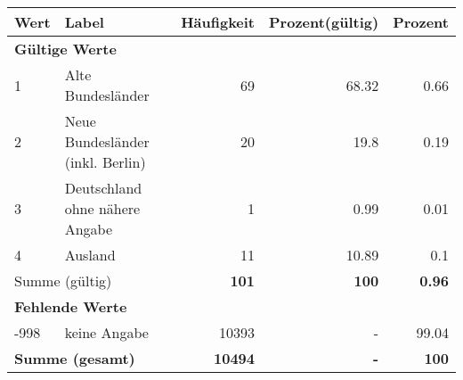      \begin{longtable}{lXrrr}
     \toprule
     \textbf{Wert} & \textbf{Label} & \textbf{Häufigkeit} & \textbf{Prozent(gültig)} & \textbf{Prozent} \\
     \endhead
     \midrule
     \multicolumn{5}{l}{\textbf{Gültige Werte}}\\

     1 &
     \multicolumn{1}{X}{ Alte Bundesländer   } &


       \num{69} &
       \num[round-mode=places,round-precision=2]{68.32} &
         \num[round-mode=places,round-precision=2]{0.66} \\

     2 &
     \multicolumn{1}{X}{ Neue Bundesländer (inkl. Berlin)   } &


       \num{20} &
       \num[round-mode=places,round-precision=2]{19.8} &
         \num[round-mode=places,round-precision=2]{0.19} \\

     3 &
     \multicolumn{1}{X}{ Deutschland ohne nähere Angabe   } &


       \num{1} &
       \num[round-mode=places,round-precision=2]{0.99} &
         \num[round-mode=places,round-precision=2]{0.01} \\

     4 &
     \multicolumn{1}{X}{ Ausland   } &


       \num{11} &
       \num[round-mode=places,round-precision=2]{10.89} &
         \num[round-mode=places,round-precision=2]{0.1} \\
     \midrule
     \multicolumn{2}{l}{Summe (gültig)} &
       \textbf{\num{101}} &
     \textbf{\num{100}} &
       \textbf{\num[round-mode=places,round-precision=2]{0.96}} \\
     \multicolumn{5}{l}{\textbf{Fehlende Werte}}\\
       -998 &
       keine Angabe &
         \num{10393} &
        - &
         \num[round-mode=places,round-precision=2]{99.04} \\
     \midrule
     \multicolumn{2}{l}{\textbf{Summe (gesamt)}} &
          \textbf{\num{10494}} &
        \textbf{-} &
        \textbf{\num{100}} \\
     \bottomrule
     \end{longtable}
     

